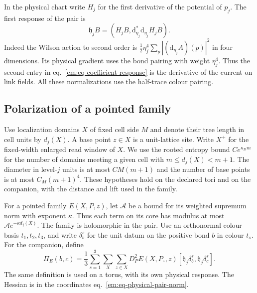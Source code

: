 \documentclass[11pt,letterpaper,reqno]{amsart}
\numberwithin{equation}{section}
\renewcommand{\eqref}[1]{\textup{eq.~\ref{#1}}}
\theoremstyle{definition}
\theoremstyle{remark}
\begin{document}
In the physical chart write $H_j$ for the first derivative of the
potential of $p_j$. The first response of the pair is
\begin{equation}\label{em:eq-coefficient-response}
       \mathfrak h_j B
       = (H_j B,\mathrm d_{\eta_j}^*\mathrm d_{\eta_j}H_j B).
\end{equation}
Indeed the Wilson action to second order is
$\tfrac12\eta_j^4\sum_p|(\mathrm d_{\eta_j}A)(p)|^2$ in four
dimensions. Its physical gradient uses the bond pairing with weight
$\eta_j^4$. Thus the second entry in
\eqref{em:eq-coefficient-response} is the derivative of the current
on link fields. All these normalizations use the half-trace colour
pairing.

\subsection{Polarization of a pointed family}

Use localization domains $X$ of fixed cell side $M$ and denote their
tree length in cell units by $d_j(X)$. A base point $z\in X$ is a
unit-lattice site. Write $X^+$ for the fixed-width enlarged read window
of $X$. We use the rooted entropy bound $C e^{\kappa_D m}$ for the
number of domains meeting a given cell with $m\le d_j(X)<m+1$.
The diameter in level-$j$ units is at most $C M(m+1)$ and the number
of base points is at most $C_M(m+1)^4$. These hypotheses hold on the
declared tori and on the companion, with the distance and lift used
in the family.

For a pointed family $E(X,P,z)$, let $\mathcal A$ be a bound for its
weighted supremum norm with exponent $\kappa$. Thus each term on
its core has modulus at most $\mathcal A e^{-\kappa d_j(X)}$.
The family is holomorphic in the pair. Use an orthonormal colour
basis $t_1,t_2,t_3$,
and write $\delta_b^s$ for the unit datum on the positive bond $b$
in colour $t_s$. For the companion, define
\begin{equation}\label{em:eq-polarization-kernel}
 \Pi_E(b,c)=\frac13\sum_{s=1}^3\sum_X\sum_{z\in X}
       D_P^2 E(X,P_\circ,z)
             [\mathfrak h_j\delta_b^s,\mathfrak h_j\delta_c^s] .
\end{equation}
The same definition is used on a torus, with its own physical
response. The Hessian is in the coordinates
\eqref{em:eq-physical-pair-norm}.
\end{document}
